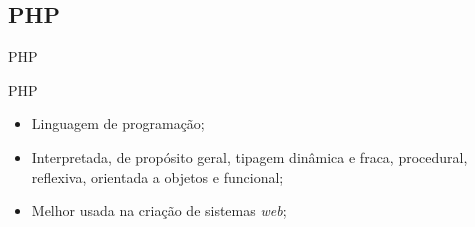 \subsection*{PHP}

\begin{frame}{PHP}
	\begin{block}{PHP}
	\begin{itemize}
		\item Linguagem de programação;
		\item Interpretada, de propósito geral, tipagem dinâmica e 
	fraca, procedural, reflexiva, orientada a objetos e funcional;
		\item Melhor usada na criação de sistemas \textit{web};
	\end{itemize}
	\end{block}
\end{frame}